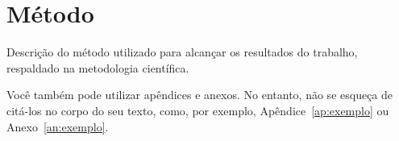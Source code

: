 \section{Método}

Descrição do método utilizado para alcançar os resultados do trabalho, respaldado na metodologia científica.

Você também pode utilizar apêndices e anexos. No entanto, não se esqueça de citá-los no corpo do seu texto, como, por exemplo, Apêndice~\ref{ap:exemplo} ou Anexo~\ref{an:exemplo}.
